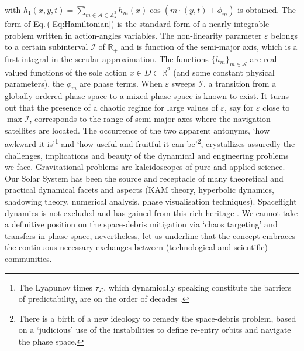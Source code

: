 \documentclass{amsart}
\theoremstyle{definition}
\theoremstyle{remark}
\numberwithin{equation}{section}
\begin{document}
with $h_{1}(x,y,t)=\sum_{m \in \mathcal{A} \subset \mathbb{Z}_{\star}^{3}} h_{m}(x) \cos (m\cdot (y,t) + \phi_{m})$
is obtained. The form of Eq.\,(\ref{Eq:Hamiltonian}) is the standard form of a nearly-integrable problem written in action-angles variables. The non-linearity parameter $\varepsilon$ belongs to a certain subinterval $\mathcal{I}$ of $\mathbb{R}_{+}$ and is function of the semi-major axis, which is a first integral in the secular approximation. The functions $\{h_{m}\}_{m \in \mathcal{A}}$ are real valued functions of the sole action $x \in D \subset \mathbb{R}^{2}$ (and some constant physical parameters),   
the $\phi_{m}$ are {\color{black}phase} terms.
When $\varepsilon$ sweeps $\mathcal{I}$, a transition from a globally ordered {\color{black} phase space} to a mixed phase space is known to exist. It turns out that the {\color{black}presence} of a chaotic regime for large {\color{black}values} of $\varepsilon$, say for $\varepsilon$ close to $\max \mathcal{I}$, corresponds to the range of semi-major {\color{black}axes} where the navigation satellites are located. The {\color{black}occurrence} of the two apparent antonyms, `how awkward it is'\footnote{
The  Lyapunov times $\tau_{\mathcal{L}}$, which dynamically speaking constitute the  barriers of predictability, are on the order {\color{black}of decades} \citep{jDa16}.} and `how useful and fruitful it can be'\footnote{
There is a birth of a {\color{black}new ideology} to remedy the space-debris problem, based on a `judicious' use of the instabilities to define re-entry orbits and navigate the {\color{black}phase space.}}, crystallizes assuredly the challenges, implications and beauty of the dynamical and {\color{black}engineering} problems we face.
{\color{black}
Gravitational problems are  kaleidoscopes of pure and applied science. Our Solar System has been the source and receptacle of many theoretical and practical dynamical facets and aspects (KAM theory, hyperbolic dynamics, shadowing theory, numerical analysis, phase visualisation techniques). Spaceflight dynamics is not excluded and has gained from this rich heritage \citep{eBo95,wKo00,ePe10}. We cannot take a definitive position on the space-debris mitigation via `chaos targeting' and transfers in phase space, nevertheless, let us underline that the concept embraces the continuous necessary exchanges between (technological and scientific) communities.  
}
\end{document}
